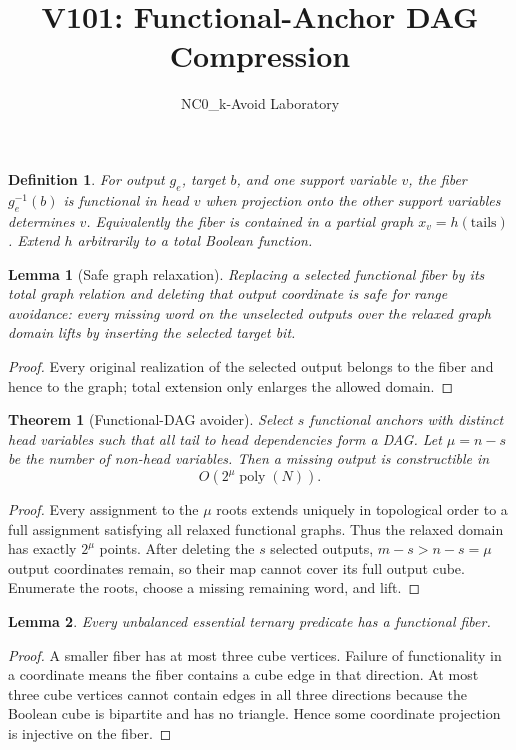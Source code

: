 \documentclass[11pt]{article}
\title{V101: Functional-Anchor DAG Compression}
\author{NC0\_k-Avoid Laboratory}
\date{}
\newtheorem{theorem}{Theorem}
\newtheorem{lemma}{Lemma}
\newtheorem{definition}{Definition}
\begin{document}
\maketitle

\begin{definition}
For output $g_e$, target $b$, and one support variable $v$, the fiber
$g_e^{-1}(b)$ is \emph{functional in head $v$} when projection onto the other
support variables determines $v$. Equivalently the fiber is contained in a
partial graph $x_v=h(\text{tails})$. Extend $h$ arbitrarily to a total Boolean
function.
\end{definition}

\begin{lemma}[Safe graph relaxation]
Replacing a selected functional fiber by its total graph relation and deleting
that output coordinate is safe for range avoidance: every missing word on the
unselected outputs over the relaxed graph domain lifts by inserting the selected
target bit.
\end{lemma}
\begin{proof}
Every original realization of the selected output belongs to the fiber and
hence to the graph; total extension only enlarges the allowed domain.
\end{proof}

\begin{theorem}[Functional-DAG avoider]
Select $s$ functional anchors with distinct head variables such that all tail to
head dependencies form a DAG. Let $\mu=n-s$ be the number of non-head variables.
Then a missing output is constructible in
\[
O(2^\mu\operatorname{poly}(N)).
\]
\end{theorem}
\begin{proof}
Every assignment to the $\mu$ roots extends uniquely in topological order to a
full assignment satisfying all relaxed functional graphs. Thus the relaxed
domain has exactly $2^\mu$ points. After deleting the $s$ selected outputs,
$m-s>n-s=\mu$ output coordinates remain, so their map cannot cover its full
output cube. Enumerate the roots, choose a missing remaining word, and lift.
\end{proof}

\begin{lemma}
Every unbalanced essential ternary predicate has a functional fiber.
\end{lemma}
\begin{proof}
A smaller fiber has at most three cube vertices. Failure of functionality in a
coordinate means the fiber contains a cube edge in that direction. At most
three cube vertices cannot contain edges in all three directions because the
Boolean cube is bipartite and has no triangle. Hence some coordinate projection
is injective on the fiber.
\end{proof}
\end{document}
